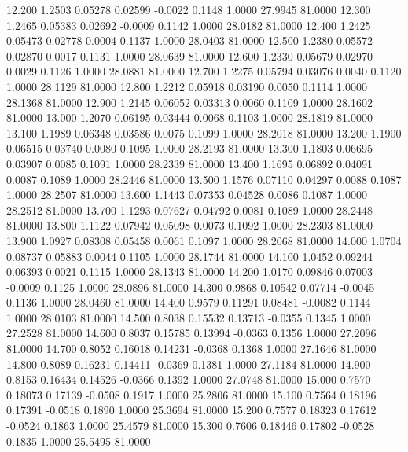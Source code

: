   12.200   1.2503   0.05278   0.02599  -0.0022   0.1148   1.0000  27.9945  81.0000
  12.300   1.2465   0.05383   0.02692  -0.0009   0.1142   1.0000  28.0182  81.0000
  12.400   1.2425   0.05473   0.02778   0.0004   0.1137   1.0000  28.0403  81.0000
  12.500   1.2380   0.05572   0.02870   0.0017   0.1131   1.0000  28.0639  81.0000
  12.600   1.2330   0.05679   0.02970   0.0029   0.1126   1.0000  28.0881  81.0000
  12.700   1.2275   0.05794   0.03076   0.0040   0.1120   1.0000  28.1129  81.0000
  12.800   1.2212   0.05918   0.03190   0.0050   0.1114   1.0000  28.1368  81.0000
  12.900   1.2145   0.06052   0.03313   0.0060   0.1109   1.0000  28.1602  81.0000
  13.000   1.2070   0.06195   0.03444   0.0068   0.1103   1.0000  28.1819  81.0000
  13.100   1.1989   0.06348   0.03586   0.0075   0.1099   1.0000  28.2018  81.0000
  13.200   1.1900   0.06515   0.03740   0.0080   0.1095   1.0000  28.2193  81.0000
  13.300   1.1803   0.06695   0.03907   0.0085   0.1091   1.0000  28.2339  81.0000
  13.400   1.1695   0.06892   0.04091   0.0087   0.1089   1.0000  28.2446  81.0000
  13.500   1.1576   0.07110   0.04297   0.0088   0.1087   1.0000  28.2507  81.0000
  13.600   1.1443   0.07353   0.04528   0.0086   0.1087   1.0000  28.2512  81.0000
  13.700   1.1293   0.07627   0.04792   0.0081   0.1089   1.0000  28.2448  81.0000
  13.800   1.1122   0.07942   0.05098   0.0073   0.1092   1.0000  28.2303  81.0000
  13.900   1.0927   0.08308   0.05458   0.0061   0.1097   1.0000  28.2068  81.0000
  14.000   1.0704   0.08737   0.05883   0.0044   0.1105   1.0000  28.1744  81.0000
  14.100   1.0452   0.09244   0.06393   0.0021   0.1115   1.0000  28.1343  81.0000
  14.200   1.0170   0.09846   0.07003  -0.0009   0.1125   1.0000  28.0896  81.0000
  14.300   0.9868   0.10542   0.07714  -0.0045   0.1136   1.0000  28.0460  81.0000
  14.400   0.9579   0.11291   0.08481  -0.0082   0.1144   1.0000  28.0103  81.0000
  14.500   0.8038   0.15532   0.13713  -0.0355   0.1345   1.0000  27.2528  81.0000
  14.600   0.8037   0.15785   0.13994  -0.0363   0.1356   1.0000  27.2096  81.0000
  14.700   0.8052   0.16018   0.14231  -0.0368   0.1368   1.0000  27.1646  81.0000
  14.800   0.8089   0.16231   0.14411  -0.0369   0.1381   1.0000  27.1184  81.0000
  14.900   0.8153   0.16434   0.14526  -0.0366   0.1392   1.0000  27.0748  81.0000
  15.000   0.7570   0.18073   0.17139  -0.0508   0.1917   1.0000  25.2806  81.0000
  15.100   0.7564   0.18196   0.17391  -0.0518   0.1890   1.0000  25.3694  81.0000
  15.200   0.7577   0.18323   0.17612  -0.0524   0.1863   1.0000  25.4579  81.0000
  15.300   0.7606   0.18446   0.17802  -0.0528   0.1835   1.0000  25.5495  81.0000
